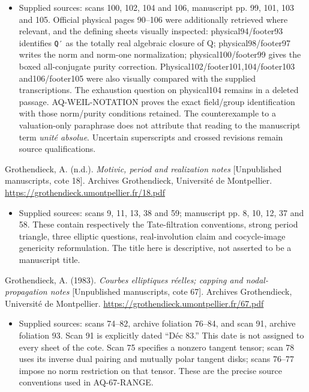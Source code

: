 \documentclass[11pt,a4paper]{article}
\providecommand{\tightlist}{\setlength{\itemsep}{0pt}\setlength{\parskip}{0pt}}
\theoremstyle{definition}\newtheorem{definition}[theorem]{Definition}
\theoremstyle{remark}\newtheorem{remark}[theorem]{Remark}
\begin{document}
\begin{itemize}
\tightlist
\item
  Supplied sources: scans 100, 102, 104 and 106, manuscript pp. 99, 101,
  103 and 105. Official physical pages 90--106 were additionally
  retrieved where relevant, and the defining sheets visually inspected:
  physical94/footer93 identifies \texttt{Q′} as the totally real
  algebraic closure of Q; physical98/footer97 writes the norm and
  norm-one normalization; physical100/footer99 gives the boxed
  all-conjugate purity correction. Physical102/footer101,104/footer103
  and106/footer105 were also visually compared with the supplied
  transcriptions. The exhaustion question on physical104 remains in a
  deleted passage. AQ-WEIL-NOTATION proves the exact field/group
  identification with those norm/purity conditions retained. The
  counterexample to a valuation-only paraphrase does not attribute that
  reading to the manuscript term \emph{unité absolue}. Uncertain
  superscripts and crossed revisions remain source qualifications.
\end{itemize}

Grothendieck, A. (n.d.). \emph{Motivic, period and realization notes}
{[}Unpublished manuscripts, cote 18{]}. Archives Grothendieck,
Université de Montpellier.
\url{https://grothendieck.umontpellier.fr/18.pdf}

\begin{itemize}
\tightlist
\item
  Supplied sources: scans 9, 11, 13, 38 and 59; manuscript pp. 8, 10,
  12, 37 and 58. These contain respectively the Tate-filtration
  conventions, strong period triangle, three elliptic questions,
  real-involution claim and cocycle-image genericity reformulation. The
  title here is descriptive, not asserted to be a manuscript title.
\end{itemize}

Grothendieck, A. (1983). \emph{Courbes elliptiques réelles; capping and
nodal-propagation notes} {[}Unpublished manuscripts, cote 67{]}.
Archives Grothendieck, Université de Montpellier.
\url{https://grothendieck.umontpellier.fr/67.pdf}

\begin{itemize}
\tightlist
\item
  Supplied sources: scans 74--82, archive foliation 76--84, and scan 91,
  archive foliation 93. Scan 91 is explicitly dated ``Déc 83.'' This
  date is not assigned to every sheet of the cote. Scan 75 specifies a
  nonzero tangent tensor; scan 78 uses its inverse dual pairing and
  mutually polar tangent disks; scans 76--77 impose no norm restriction
  on that tensor. These are the precise source conventions used in
  AQ-67-RANGE.
\end{itemize}
\end{document}
